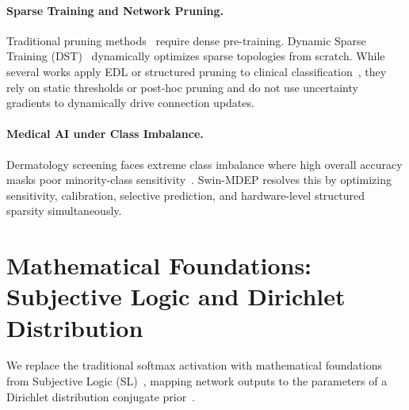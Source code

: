 \documentclass[letterpaper]{article} %
\begin{document}
\paragraph{Sparse Training and Network Pruning.} Traditional pruning methods~\cite{han2016deep, frankle2019lottery} require dense pre-training. Dynamic Sparse Training (DST)~\cite{mocanu2018scalable, evci2020rigging} dynamically optimizes sparse topologies from scratch. While several works apply EDL or structured pruning to clinical classification~\cite{zhou2023domain, gabetni2025ensembling}, they rely on static thresholds or post-hoc pruning and do not use uncertainty gradients to dynamically drive connection updates.

\paragraph{Medical AI under Class Imbalance.} Dermatology screening faces extreme class imbalance where high overall accuracy masks poor minority-class sensitivity~\cite{esteva2017dermatologist, johnson2019survey}. Swin-MDEP resolves this by optimizing sensitivity, calibration, selective prediction, and hardware-level structured sparsity simultaneously.

\section{Mathematical Foundations: Subjective Logic and Dirichlet Distribution}\label{sec:math}

We replace the traditional softmax activation with mathematical foundations from Subjective Logic (SL)~\cite{josang2016subjective}, mapping network outputs to the parameters of a Dirichlet distribution conjugate prior~\cite{sensoy2018evidential}.
\end{document}
